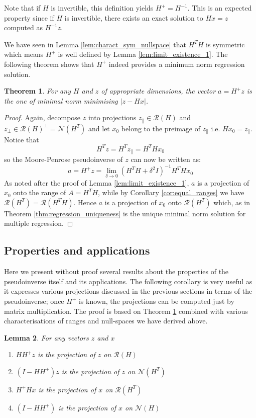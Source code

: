 \documentclass[a4paper,11pt]{article}
\theoremstyle{break}
\newtheorem{theorem}{Theorem}[section]
\newtheorem{lemma}[theorem]{Lemma}
\newcommand{\Nu}{\mathcal{N}}
\newcommand{\Ra}{\mathcal{R}}
\newcommand{\pll}{\parallel}
\begin{document}
Note that if $H$ is invertible, this definition yields $H^+ = H^{-1}$. This is an expected property since if $H$ is invertible, there exists an exact solution to $ H x = z $ computed as $ H^{-1} z$.

We have seen in Lemma \ref{lem:charact_sym_nullspace} that $H^T H$ is symmetric which means $H^+$ is well defined by Lemma \ref{lem:limit_existence_1}. The following theorem shows that $ H^+$ indeed provides a minimum norm regression solution.

\begin{theorem}\label{thm:mp_solves_regression}
    For any $H$ and $z$ of appropriate dimensions, the vector $a = H^+ z$ is the one of minimal norm minimising $ | z - H x | $.
\end{theorem}

\begin{proof}
    Again, decompose $z$ into projections $z_\pll \in \Ra(H)$ and $z_\perp \in \Ra(H)^\perp = \Nu(H^T)$ and let $x_0$ belong to the preimage of $z_\pll$ i.e. $H x_0 = z_\pll$. Notice that
        $$ H^T z = H^T z_\pll = H^T H x_0$$
    so the Moore-Penrose pseudoinverse of $z$ can now be written as:
        $$ a = H^+ z
         = \lim_{\delta \to 0} (H^T H + \delta^2 I)^{-1} H^T H x_0
        $$
    As noted after the proof of Lemma \ref{lem:limit_existence_1}, $a$ is a projection of $x_0$ onto the range of $ A = H^T H $, while by Corollary \ref{cor:equal_ranges} we have $\Ra(H^T) = \Ra(H^T H)$.
    Hence $a$ is a projection of $x_0$ onto $\Ra(H^T)$ which, as in Theorem \ref{thm:regression_uniqueness} is the unique minimal norm solution for multiple regression.
\end{proof}

\subsection{Properties and applications}

Here we present without proof several results about the properties of the pseudoinverse itself and its applications. The following corollary is very useful as it expresses various projections discussed in the previous sections in terms of the pseudoinverse; once $ H^+ $ is known, the projections can be computed just by matrix multiplication. The proof is based on Theorem \ref{thm:mp_solves_regression} combined with various characterisations of ranges and null-spaces we have derived above.

\begin{lemma}
    For any vectors $z$ and $x$
    \begin{enumerate}
        \item $ H H^+ z $ is the projection of $z$ on $\Ra(H)$
        \item $ (I - H H^+) z $ is the projection of $z$ on $\Nu(H^T)$
        \item $ H^+ H x$ is the projection of $x$ on $ \Ra(H^T)$
        \item $ (I - H H^+) $ is the projection of $x$ on $ \Nu(H)$
    \end{enumerate}
\end{lemma}
\end{document}

